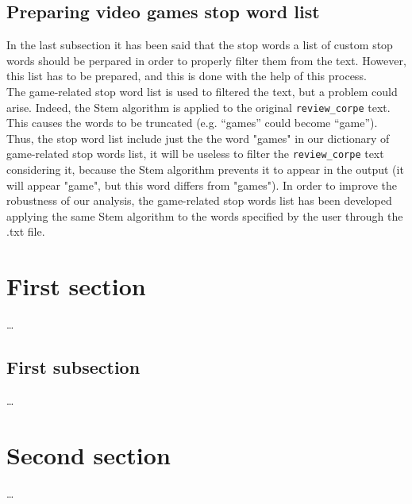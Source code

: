 \documentclass[a4paper]{article}
\begin{document}
 		\subsection{Preparing video games stop word list}
		 	In the last subsection it has been said that the stop words a list of custom stop words should be perpared in order to properly filter them from the text. However, this list has to be prepared, and this is done with the help of this process.\\
		 	The game-related stop word list is used to filtered the text, but a problem could arise. Indeed, the Stem algorithm is applied to the original \verb*|review_corpe| text. This causes the words to be truncated (e.g. ``games'' could become ``game''). Thus, the stop word list include just the the word "games" in our dictionary of game-related stop words list, it will be useless to filter the \verb*|review_corpe| text considering it, because the Stem algorithm prevents it to appear in the output (it will appear "game", but this word differs from "games"). In order to improve the robustness of our analysis, the game-related stop words list has been developed applying the same Stem algorithm to the words specified by the user through the .txt file.
		 	
		 	

		 	
	
	\section{First section}
		\dots
			
		\subsection*{First subsection}
			\dots
			
	\section{Second section}
		\dots
		
	\nocite{*}
	\printbibliography 
		
\end{document}
